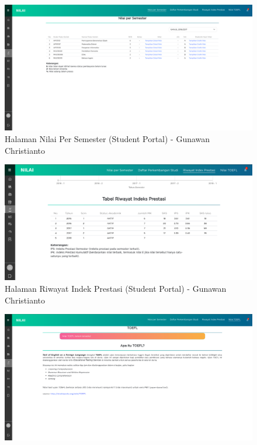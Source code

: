 \begin{itemize}
\begin{enumerate}
\begin{figure}[H]
		\end{figure}
		\begin{figure}[H]
			\centering
			\includegraphics[scale=0.25]{Gambar/HasilPengujian/2016_1_nps_studentportal}
			\caption{Halaman Nilai Per Semester (Student Portal) - Gunawan Christianto}
			\label{fig:2016_1_nps_studentportal}
		\end{figure}
		\begin{figure}[H]
			\centering
			\includegraphics[scale=0.35]{Gambar/HasilPengujian/2016_1_rip_studentportal}
			\caption{Halaman Riwayat Indek Prestasi (Student Portal) - Gunawan Christianto}
			\label{fig:2016_1_rip_studentportal}
		\end{figure}
		\begin{figure}[H]
			\centering
			\includegraphics[scale=0.25]{Gambar/HasilPengujian/2016_1_toefl_studentportal}

\end{figure}
\end{enumerate}
\end{itemize}
